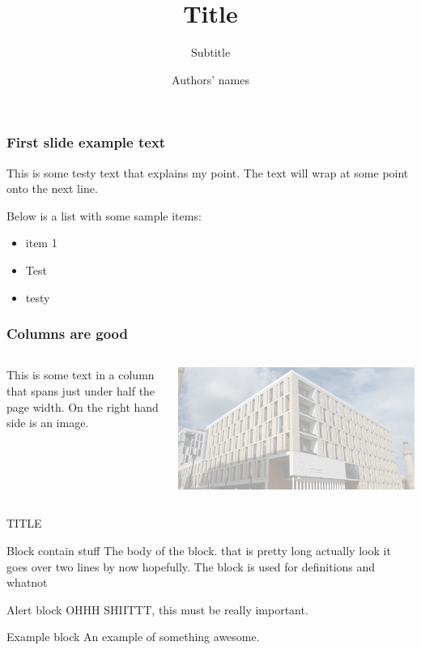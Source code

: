 \documentclass[aspectratio=169]{beamer}
\title{Title}
\subtitle{Subtitle}
\author{Authors' names}
\institute{Institute}
\begin{document}
\maketitle

\begin{frame}
	\frametitle{First slide example text}
	This is some testy text that explains my point. The text will wrap at some point onto the next line.

	Below is a list with some sample items:

	\begin{itemize}
		\item{item 1}
		\item{Test}
		\item{testy}
	\end{itemize}
\end{frame}

\begin{frame}
	\frametitle{Columns are good}
	\begin{columns}

		This is some text in a column that spans just under half the page width. On the right hand side is an image.

		\includegraphics[width=\textwidth]{background}
	\end{columns}
\end{frame}

\begin{frame}{TITLE}
	\begin{block}{Block contain stuff}
		The body of the block. that is pretty long actually look it goes over two lines by now hopefully. The block is used for definitions and whatnot
	\end{block}
	\begin{alertblock}{Alert block}
		OHHH SHIITTT, this must be really important.
	\end{alertblock}
	\begin{exampleblock}{Example block}
		An example of something awesome.
	\end{exampleblock}
\end{frame}
\end{document}
